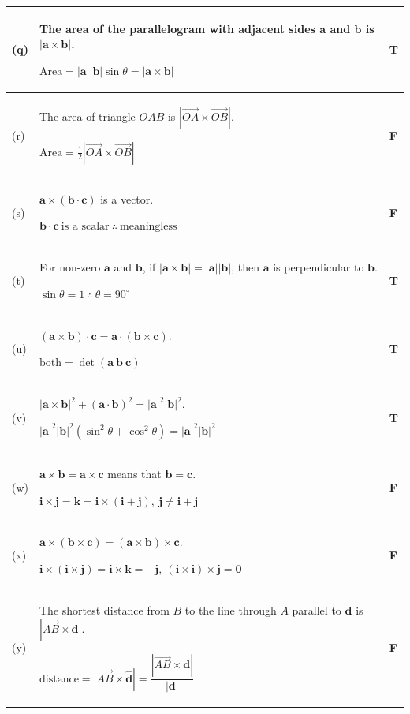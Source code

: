 \documentclass[a4paper,11pt,oneside]{book}
\providecommand{\vv}[1]{\overrightarrow{#1}}\providecommand{\cvv}[3]{\begin{pmatrix}#1\\#2\\#3\end{pmatrix}}
\begin{document}
{\begin{longtable}{|>{\centering\arraybackslash}p{0.9cm}|p{\dimexpr\linewidth-0.9cm-1.6cm-6\tabcolsep-4\arrayrulewidth\relax}|>{\centering\arraybackslash}p{1.6cm}|}
(q)&The area of the parallelogram with adjacent sides $\mathbf a$ and $\mathbf b$ is $|\mathbf a\times\mathbf b|$.\par\smallskip $\displaystyle \text{Area}=|\mathbf a||\mathbf b|\sin\theta=|\mathbf a\times\mathbf b|$\rule[-6pt]{0pt}{6pt}&\textbf{T}\\\hline
(r)&The area of triangle $OAB$ is $|\vv{OA}\times\vv{OB}|$.\par\smallskip $\displaystyle \text{Area}=\tfrac12|\vv{OA}\times\vv{OB}|$\rule[-6pt]{0pt}{6pt}&\textbf{F}\\\hline
(s)&$\mathbf a\times(\mathbf b\cdot\mathbf c)$ is a vector.\par\smallskip $\displaystyle \mathbf b\cdot\mathbf c\ \text{is a scalar}\ \therefore\ \text{meaningless}$\rule[-6pt]{0pt}{6pt}&\textbf{F}\\\hline
(t)&For non-zero $\mathbf a$ and $\mathbf b$, if $|\mathbf a\times\mathbf b|=|\mathbf a||\mathbf b|$, then $\mathbf a$ is perpendicular to $\mathbf b$.\par\smallskip $\displaystyle \sin\theta=1\ \therefore\ \theta=90^\circ$\rule[-6pt]{0pt}{6pt}&\textbf{T}\\\hline
(u)&$(\mathbf a\times\mathbf b)\cdot\mathbf c=\mathbf a\cdot(\mathbf b\times\mathbf c)$.\par\smallskip $\displaystyle \text{both}=\det\left(\mathbf a\ \mathbf b\ \mathbf c\right)$\rule[-6pt]{0pt}{6pt}&\textbf{T}\\\hline
(v)&$|\mathbf a\times\mathbf b|^2+(\mathbf a\cdot\mathbf b)^2=|\mathbf a|^2|\mathbf b|^2$.\par\smallskip $\displaystyle |\mathbf a|^2|\mathbf b|^2(\sin^2\theta+\cos^2\theta)=|\mathbf a|^2|\mathbf b|^2$\rule[-6pt]{0pt}{6pt}&\textbf{T}\\\hline
(w)&$\mathbf a\times\mathbf b=\mathbf a\times\mathbf c$ means that $\mathbf b=\mathbf c$.\par\smallskip $\displaystyle \mathbf i\times\mathbf j=\mathbf k=\mathbf i\times(\mathbf i+\mathbf j),\ \mathbf j\neq\mathbf i+\mathbf j$\rule[-6pt]{0pt}{6pt}&\textbf{F}\\\hline
(x)&$\mathbf a\times(\mathbf b\times\mathbf c)=(\mathbf a\times\mathbf b)\times\mathbf c$.\par\smallskip $\displaystyle \mathbf i\times(\mathbf i\times\mathbf j)=\mathbf i\times\mathbf k=-\mathbf j,\ (\mathbf i\times\mathbf i)\times\mathbf j=\mathbf 0$\rule[-6pt]{0pt}{6pt}&\textbf{F}\\\hline
(y)&The shortest distance from $B$ to the line through $A$ parallel to $\mathbf d$ is $|\vv{AB}\times\mathbf d|$.\par\smallskip $\displaystyle \text{distance}=|\vv{AB}\times\hat{\mathbf d}|=\dfrac{|\vv{AB}\times\mathbf d|}{|\mathbf d|}$\rule[-6pt]{0pt}{6pt}&\textbf{F}\\\hline

\end{longtable}}
\end{document}
